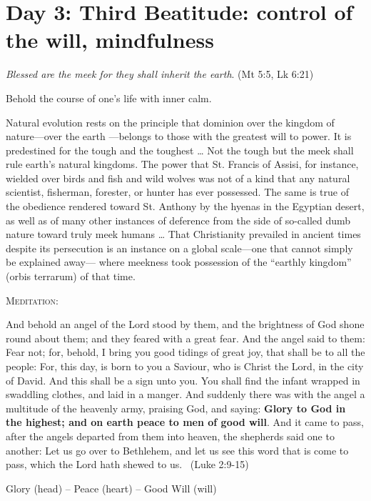 \section{Day 3: Third Beatitude: control of the will, mindfulness}

\emph{Blessed are the meek for they shall inherit the earth}. (Mt 5:5, Lk 6:21)

Behold the course of one's life with inner calm.

\begin{quotex}
Natural evolution rests on the principle that dominion over the kingdom of nature—over the earth —belongs to those with the greatest will to power. It is predestined for the tough and the toughest … Not the tough but the meek shall rule earth's natural kingdoms. The power that St. Francis of Assisi, for instance, wielded over birds and fish and wild wolves was not of a kind that any natural scientist, fisherman, forester, or hunter has ever possessed. The same is true of the obedience rendered toward St. Anthony by the hyenas in the Egyptian desert, as well as of many other instances of deference from the side of so-called dumb nature toward truly meek humans … That Christianity prevailed in ancient times despite its persecution is an instance on a global scale—one that cannot simply be explained away— where meekness took possession of the ``earthly kingdom'' (orbis terrarum) of that time. 

\end{quotex}
\textsc{Meditation}:

And behold an angel of the Lord stood by them, and the brightness of God shone round about them; and they feared with a great fear. And the angel said to them: Fear not; for, behold, I bring you good tidings of great joy, that shall be to all the people: For, this day, is born to you a Saviour, who is Christ the Lord, in the city of David. And this shall be a sign unto you. You shall find the infant wrapped in swaddling clothes, and laid in a manger. And suddenly there was with the angel a multitude of the heavenly army, praising God, and saying: \textbf{Glory to God in the highest; and on earth peace to men of good will}. And it came to pass, after the angels departed from them into heaven, the shepherds said one to another: Let us go over to Bethlehem, and let us see this word that is come to pass, which the Lord hath shewed to us.  (Luke 2:9-15)

Glory (head) – Peace (heart) – Good Will (will)

